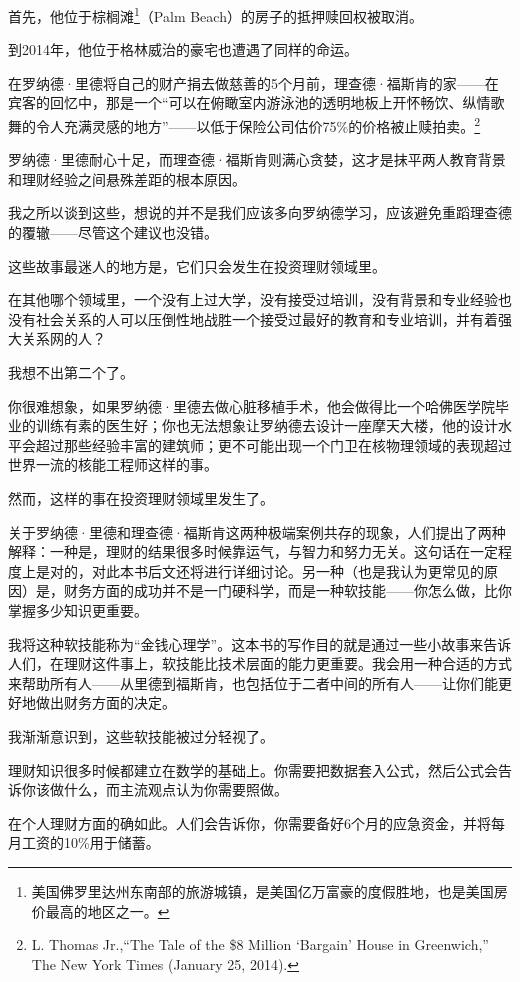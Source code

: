 首先，他位于棕榈滩\footnote{美国佛罗里达州东南部的旅游城镇，是美国亿万富豪的度假胜地，也是美国房价最高的地区之一。}（Palm Beach）的房子的抵押赎回权被取消。

到2014年，他位于格林威治的豪宅也遭遇了同样的命运。

在罗纳德·里德将自己的财产捐去做慈善的5个月前，理查德·福斯肯的家——在宾客的回忆中，那是一个“可以在俯瞰室内游泳池的透明地板上开怀畅饮、纵情歌舞的令人充满灵感的地方”——以低于保险公司估价75\%的价格被止赎拍卖。\footnote{L. Thomas Jr.,“The Tale of the \$8 Million ‘Bargain’ House in Greenwich,” The New York Times (January 25, 2014).}

罗纳德·里德耐心十足，而理查德·福斯肯则满心贪婪，这才是抹平两人教育背景和理财经验之间悬殊差距的根本原因。

我之所以谈到这些，想说的并不是我们应该多向罗纳德学习，应该避免重蹈理查德的覆辙——尽管这个建议也没错。

这些故事最迷人的地方是，它们只会发生在投资理财领域里。

在其他哪个领域里，一个没有上过大学，没有接受过培训，没有背景和专业经验也没有社会关系的人可以压倒性地战胜一个接受过最好的教育和专业培训，并有着强大关系网的人？

我想不出第二个了。

你很难想象，如果罗纳德·里德去做心脏移植手术，他会做得比一个哈佛医学院毕业的训练有素的医生好；你也无法想象让罗纳德去设计一座摩天大楼，他的设计水平会超过那些经验丰富的建筑师；更不可能出现一个门卫在核物理领域的表现超过世界一流的核能工程师这样的事。

然而，这样的事在投资理财领域里发生了。

关于罗纳德·里德和理查德·福斯肯这两种极端案例共存的现象，人们提出了两种解释：一种是，理财的结果很多时候靠运气，与智力和努力无关。这句话在一定程度上是对的，对此本书后文还将进行详细讨论。另一种（也是我认为更常见的原因）是，财务方面的成功并不是一门硬科学，而是一种软技能——你怎么做，比你掌握多少知识更重要。

我将这种软技能称为“金钱心理学”。这本书的写作目的就是通过一些小故事来告诉人们，在理财这件事上，软技能比技术层面的能力更重要。我会用一种合适的方式来帮助所有人——从里德到福斯肯，也包括位于二者中间的所有人——让你们能更好地做出财务方面的决定。

我渐渐意识到，这些软技能被过分轻视了。

理财知识很多时候都建立在数学的基础上。你需要把数据套入公式，然后公式会告诉你该做什么，而主流观点认为你需要照做。

在个人理财方面的确如此。人们会告诉你，你需要备好6个月的应急资金，并将每月工资的10\%用于储蓄。

